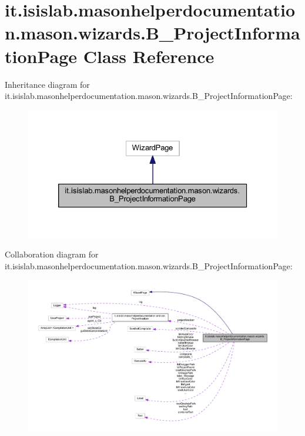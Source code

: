 \hypertarget{classit_1_1isislab_1_1masonhelperdocumentation_1_1mason_1_1wizards_1_1_b___project_information_page}{\section{it.\-isislab.\-masonhelperdocumentation.\-mason.\-wizards.\-B\-\_\-\-Project\-Information\-Page Class Reference}
\label{classit_1_1isislab_1_1masonhelperdocumentation_1_1mason_1_1wizards_1_1_b___project_information_page}
}


Inheritance diagram for it.\-isislab.\-masonhelperdocumentation.\-mason.\-wizards.\-B\-\_\-\-Project\-Information\-Page\-:
\nopagebreak
\begin{figure}[H]
\begin{center}
\leavevmode
\includegraphics[width=326pt]{classit_1_1isislab_1_1masonhelperdocumentation_1_1mason_1_1wizards_1_1_b___project_information_page__inherit__graph}
\end{center}
\end{figure}


Collaboration diagram for it.\-isislab.\-masonhelperdocumentation.\-mason.\-wizards.\-B\-\_\-\-Project\-Information\-Page\-:
\nopagebreak
\begin{figure}[H]
\begin{center}
\leavevmode
\includegraphics[width=350pt]{classit_1_1isislab_1_1masonhelperdocumentation_1_1mason_1_1wizards_1_1_b___project_information_page__coll__graph}
\end{center}
\end{figure}
